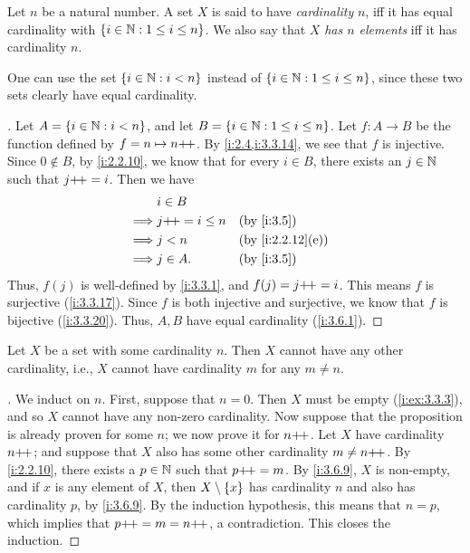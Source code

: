 \begin{defn}\label{i:3.6.5}
  Let \(n\) be a natural number.
  A set \(X\) is said to have \emph{cardinality} \(n\), iff it has equal cardinality with \(\left\lbrace i \in \mathbb{N} : 1 \leq i \leq n\right\rbrace\).
  We also say that \(X\) \emph{has \(n\) elements} iff it has cardinality \(n\).
\end{defn}

\begin{rmk}\label{i:3.6.6}
  One can use the set \(\left\lbrace i \in \mathbb{N} : i < n\right\rbrace\) instead of \(\left\lbrace i \in \mathbb{N} : 1 \leq i \leq n\right\rbrace\), since these two sets clearly have equal cardinality.
\end{rmk}

\begin{proof}[]
  Let \(A = \left\lbrace i \in \mathbb{N} : i < n\right\rbrace\), and let \(B = \left\lbrace i \in \mathbb{N} : 1 \leq i \leq n\right\rbrace\).
  Let \(f : A \to B\) be the function defined by \(f = n \mapsto n{+}\!{+}\).
  By \cref{i:2.4,i:3.3.14}, we see that \(f\) is injective.
  Since \(0 \notin B\), by \cref{i:2.2.10}, we know that for every \(i \in B\), there exists an \(j \in \mathbb{N}\) such that \(j{+}\!{+} = i\).
  Then we have
  \begin{align*}
             & i \in B                               \\
    \implies & j\pp = i \leq n &  & \by{i:3.5}       \\
    \implies & j < n           &  & \by{i:2.2.12}[e] \\
    \implies & j \in A.        &  & \by{i:3.5}
  \end{align*}
  Thus, \(f(j)\) is well-defined by \cref{i:3.3.1}, and \(f(j) = j{+}\!{+} = i\).
  This means \(f\) is surjective (\cref{i:3.3.17}).
  Since \(f\) is both injective and surjective, we know that \(f\) is bijective (\cref{i:3.3.20}).
  Thus, \(A, B\) have equal cardinality (\cref{i:3.6.1}).
\end{proof}

\setcounter{thm}{7}
\begin{prop}\label{i:3.6.8}
  Let \(X\) be a set with some cardinality \(n\).
  Then \(X\) cannot have any other cardinality, i.e., \(X\) cannot have cardinality \(m\) for any \(m \neq n\).
\end{prop}

\begin{proof}[]
  We induct on \(n\).
  First, suppose that \(n = 0\).
  Then \(X\) must be empty (\cref{i:ex:3.3.3}), and so \(X\) cannot have any non-zero cardinality.
  Now suppose that the proposition is already proven for some \(n\);
  we now prove it for \(n{+}\!{+}\).
  Let \(X\) have cardinality \(n{+}\!{+}\);
  and suppose that \(X\) also has some other cardinality \(m \neq n{+}\!{+}\).
  By \cref{i:2.2.10}, there exists a \(p \in \mathbb{N}\) such that \(p{+}\!{+} = m\).
  By \cref{i:3.6.9}, \(X\) is non-empty, and if \(x\) is any element of \(X\), then \(X \setminus \left\lbrace x\right\rbrace\) has cardinality \(n\) and also has cardinality \(p\), by \cref{i:3.6.9}.
  By the induction hypothesis, this means that \(n = p\), which implies that \(p{+}\!{+} = m = n{+}\!{+}\), a contradiction.
  This closes the induction.
\end{proof}

